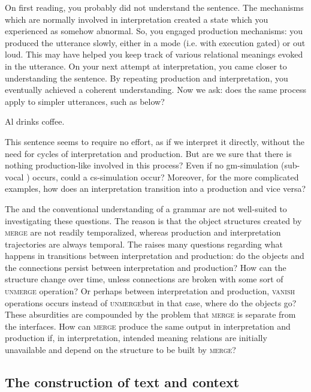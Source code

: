   On first reading, you probably did not understand the sentence. The mechanisms which are normally involved in interpretation created a state which you experienced as somehow abnormal. So, you engaged production mechanisms: you produced the utterance slowly, either in a  mode (i.e. with execution gated) or out loud. This may have helped you keep track of various relational meanings evoked in the utterance. On your next attempt at interpretation, you came closer to understanding the sentence. By repeating production and interpretation, you eventually achieved a coherent understanding. Now we ask: does the same process apply to simpler utterances, such as below?

\ea
Al drinks coffee.
\z

  This sentence seems to require no effort, as if we interpret it directly, without the need for cycles of interpretation and production. But are we sure that there is nothing production-like involved in this process? Even if no gm-simulation (sub-vocal ) occurs, could a cs-simulation occur? Moreover, for the more complicated examples, how does an interpretation transition into a production and vice versa?

  The  and the conventional understanding of a grammar are not well-suited to investigating these questions. The reason is that the object structures created by \textsc{merge} are not readily temporalized, whereas production and interpretation trajectories are always temporal. The  raises many questions regarding what happens in transitions between interpretation and production: do the objects and the connections persist between interpretation and production? How can the structure change over time, unless connections are broken with some sort of \textsc{unmerge} operation? Or perhaps between interpretation and production, \textsc{vanish} operations occurs instead of \textsc{unmerge}{\textemdash}but in that case, where do the objects go? These absurdities are compounded by the problem that \textsc{merge} is separate from the  interfaces. How can \textsc{merge} produce the same output in interpretation and production if, in interpretation, intended meaning relations are initially unavailable and depend on the structure to be built by \textsc{merge?} 

\subsection{The construction of text and context}

